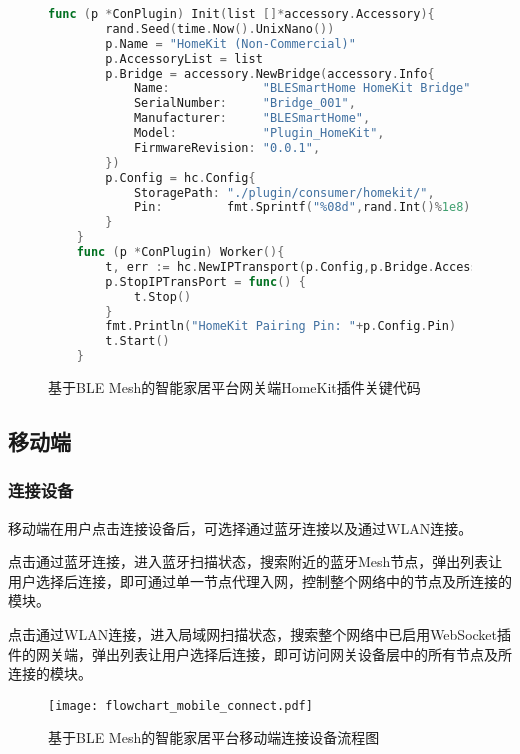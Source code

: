 \begin{figure}[H]
    \centering
    \begin{lstlisting}[language=Go]
    func (p *ConPlugin) Init(list []*accessory.Accessory){
        rand.Seed(time.Now().UnixNano())
        p.Name = "HomeKit (Non-Commercial)"
        p.AccessoryList = list
        p.Bridge = accessory.NewBridge(accessory.Info{
            Name:             "BLESmartHome HomeKit Bridge",
            SerialNumber:     "Bridge_001",
            Manufacturer:     "BLESmartHome",
            Model:            "Plugin_HomeKit",
            FirmwareRevision: "0.0.1",
        })
        p.Config = hc.Config{
            StoragePath: "./plugin/consumer/homekit/",
            Pin:         fmt.Sprintf("%08d",rand.Int()%1e8),
        }
    }
    func (p *ConPlugin) Worker(){
	    t, err := hc.NewIPTransport(p.Config,p.Bridge.Accessory,p.AccessoryList...)
	    p.StopIPTransPort = func() {
	    	t.Stop()
        }
	    fmt.Println("HomeKit Pairing Pin: "+p.Config.Pin)
	    t.Start()
    }
    \end{lstlisting}
    \caption{基于BLE Mesh的智能家居平台网关端HomeKit插件关键代码}
    \label{fig:code_gateway_plugin_homekit}
\end{figure}

\subsection{移动端}

\subsubsection{连接设备}
移动端在用户点击连接设备后，可选择通过蓝牙连接以及通过WLAN连接。

点击通过蓝牙连接，进入蓝牙扫描状态，搜索附近的蓝牙Mesh节点，弹出列表让用户选择后连接，即可通过单一节点代理入网，控制整个网络中的节点及所连接的模块。

点击通过WLAN连接，进入局域网扫描状态，搜索整个网络中已启用WebSocket插件的网关端，弹出列表让用户选择后连接，即可访问网关设备层中的所有节点及所连接的模块。

\begin{figure}[H]
    \centering
    \texttt{[image: flowchart\_mobile\_connect.pdf]}
    \caption{基于BLE Mesh的智能家居平台移动端连接设备流程图}
    \label{fig:flowchart_mobile_connect}
\end{figure}

